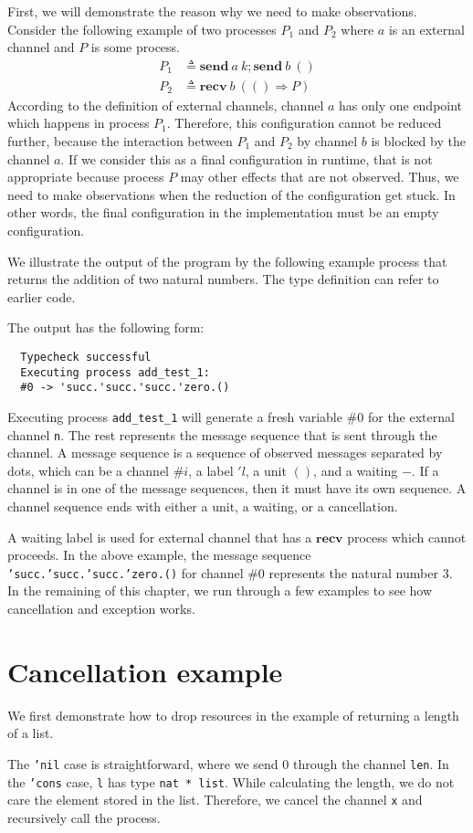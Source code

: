 \documentclass[12pt, openany]{memoir}
\newcommand*{\send}[2]{\textbf{send}\ #1\ #2}
\newcommand*{\recv}[2]{\textbf{recv}\ #1\ #2}
\begin{document}
First, we will demonstrate the reason why we need to make observations. Consider the following example of two processes $P_1$ and $P_2$ where $a$ is an external channel and $P$ is some process.
\begin{align*}
  P_1 & \triangleq \send{a}{k}; \send{b}{()}\\
  P_2 & \triangleq \recv{b}{(() \Rightarrow P)}
\end{align*}
According to the definition of external channels, channel $a$ has only one endpoint which happens in process $P_1$. 
Therefore, this configuration cannot be reduced further, because the interaction between $P_1$ and $P_2$ by channel $b$ is blocked by the channel $a$.
If we consider this as a final configuration in runtime, that is not appropriate because process $P$ may other effects that are not observed.
Thus, we need to make observations when the reduction of the configuration get stuck. 
In other words, the final configuration in the implementation must be an empty configuration.

We illustrate the output of the program by the following example process that returns the addition of two natural numbers.
The type definition can refer to earlier code.

The output has the following form:
\begin{verbatim}
  Typecheck successful                  
  Executing process add_test_1:
  #0 -> 'succ.'succ.'succ.'zero.()
\end{verbatim}
Executing process \texttt{add\_test\_1} will generate a fresh variable $\# 0$ for the external channel \texttt{n}.
The rest represents the message sequence that is sent through the channel. 
A message sequence is a sequence of observed messages separated by dots, which can be a channel $\# i$, a label $'l$, a unit $()$, and a waiting $-$.
If a channel is in one of the message sequences, then it must have its own sequence.
A channel sequence ends with either a unit, a waiting, or a cancellation.

A waiting label is used for external channel that has a $\textbf{recv}$ process which cannot proceeds.
In the above example, the message sequence \texttt{'succ.'succ.'succ.'zero.()} for channel $\# 0$ represents the natural number $3$.
In the remaining of this chapter, we run through a few examples to see how cancellation and exception works.
\section{Cancellation example}
We first demonstrate how to drop resources in the example of returning a length of a list.

The \texttt{'nil} case is straightforward, where we send $0$ through the channel \texttt{len}.
In the \texttt{'cons} case, \texttt{l} has type \texttt{nat * list}.
While calculating the length, we do not care the element stored in the list.
Therefore, we cancel the channel \texttt{x} and recursively call the process.
\end{document}
